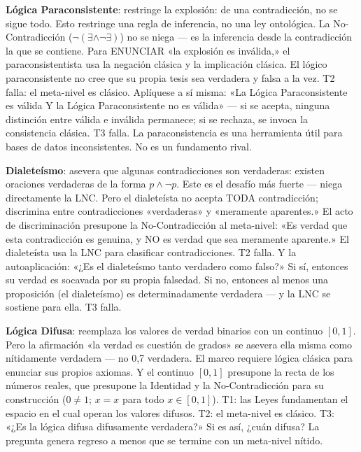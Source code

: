 \documentclass[10pt, openany, oneside]{book}
\begin{document}
\textbf{Lógica Paraconsistente}: restringe la explosión: de una contradicción, no se sigue todo. Esto restringe una regla de inferencia, no una ley ontológica. La No-Contradicción ($\neg(\exists \wedge \neg\exists)$) no se niega --- es la inferencia desde la contradicción la que se contiene. Para ENUNCIAR «la explosión es inválida,» el paraconsistentista usa la negación clásica y la implicación clásica. El lógico paraconsistente no cree que su propia tesis sea verdadera y falsa a la vez. T2 falla: el meta-nivel es clásico. Aplíquese a sí misma: «La Lógica Paraconsistente es válida Y la Lógica Paraconsistente no es válida» --- si se acepta, ninguna distinción entre válida e inválida permanece; si se rechaza, se invoca la consistencia clásica. T3 falla. La paraconsistencia es una herramienta útil para bases de datos inconsistentes. No es un fundamento rival.

\textbf{Dialeteísmo}: asevera que algunas contradicciones son verdaderas: existen oraciones verdaderas de la forma $p \wedge \neg p$. Este es el desafío más fuerte --- niega directamente la LNC. Pero el dialeteísta no acepta TODA contradicción; discrimina entre contradicciones «verdaderas» y «meramente aparentes.» El acto de discriminación presupone la No-Contradicción al meta-nivel: «Es verdad que esta contradicción es genuina, y NO es verdad que sea meramente aparente.» El dialeteísta usa la LNC para clasificar contradicciones. T2 falla. Y la autoaplicación: «¿Es el dialeteísmo tanto verdadero como falso?» Si sí, entonces su verdad es socavada por su propia falsedad. Si no, entonces al menos una proposición (el dialeteísmo) es determinadamente verdadera --- y la LNC se sostiene para ella. T3 falla.

\textbf{Lógica Difusa}: reemplaza los valores de verdad binarios con un continuo $[0, 1]$. Pero la afirmación «la verdad es cuestión de grados» se asevera ella misma como nítidamente verdadera --- no 0,7 verdadera. El marco requiere lógica clásica para enunciar sus propios axiomas. Y el continuo $[0, 1]$ presupone la recta de los números reales, que presupone la Identidad y la No-Contradicción para su construcción ($0 \neq 1$; $x = x$ para todo $x \in [0,1]$). T1: las Leyes fundamentan el espacio en el cual operan los valores difusos. T2: el meta-nivel es clásico. T3: «¿Es la lógica difusa difusamente verdadera?» Si es así, ¿cuán difusa? La pregunta genera regreso a menos que se termine con un meta-nivel nítido.
\end{document}
